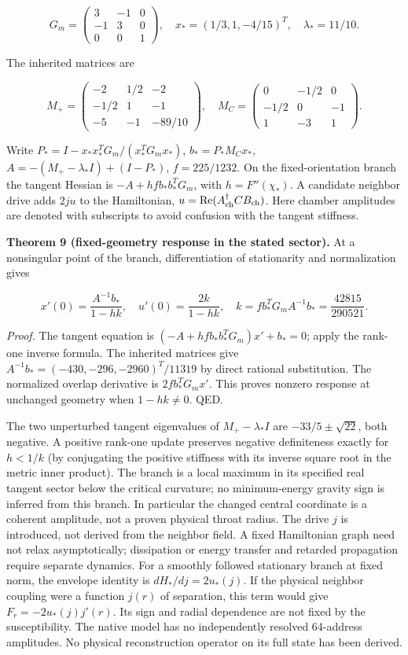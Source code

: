 \documentclass[
  11pt,
]{article}
\begin{document}
\[G_m=\begin{pmatrix}3&-1&0\\-1&3&0\\0&0&1\end{pmatrix},\quad x_*=(1/3,1,-4/15)^T,\quad \lambda_*=11/10.\]

The inherited matrices are

\[M_+=\begin{pmatrix}-2&1/2&-2\\-1/2&1&-1\\-5&-1&-89/10\end{pmatrix},\quad M_C=\begin{pmatrix}0&-1/2&0\\-1/2&0&-1\\1&-3&1\end{pmatrix}.\]

Write \(P_*=I-x_*x_*^TG_m/(x_*^TG_mx_*)\), \(b_*=P_*M_Cx_*\),
\(A=-(M_+-\lambda_*I)+(I-P_*)\), \(f=225/1232\). On the
fixed-orientation branch the tangent Hessian is \(-A+h f b_* b_*^TG_m\),
with \(h=F''(\chi_*)\). A candidate neighbor drive adds \(2j u\) to the
Hamiltonian, \(u=\operatorname{Re}(A_{\rm ch}^\dagger C B_{\rm ch})\).
Here chamber amplitudes are denoted with subscripts to avoid confusion
with the tangent stiffness.

\textbf{Theorem 9 (fixed-geometry response in the stated sector).} At a
nonsingular point of the branch, differentiation of stationarity and
normalization gives

\[x'(0)=\frac{A^{-1}b_*}{1-hk},\quad u'(0)=\frac{2k}{1-hk},\quad k=f b_*^TG_mA^{-1}b_*=\frac{42815}{290521}.\]

\emph{Proof.} The tangent equation is \((-A+hf b_*b_*^TG_m)x'+b_*=0\);
apply the rank-one inverse formula. The inherited matrices give
\(A^{-1}b_*=(-430,-296,-2960)^T/11319\) by direct rational substitution.
The normalized overlap derivative is \(2f b_*^TG_m x'\). This proves
nonzero response at unchanged geometry when \(1-hk\ne0\). QED.

The two unperturbed tangent eigenvalues of \(M_+-\lambda_*I\) are
\(-33/5\pm\sqrt{22}\), both negative. A positive rank-one update
preserves negative definiteness exactly for \(h<1/k\) (by conjugating
the positive stiffness with its inverse square root in the metric inner
product). The branch is a local maximum in its specified real tangent
sector below the critical curvature; no minimum-energy gravity sign is
inferred from this branch. In particular the changed central coordinate
is a coherent amplitude, not a proven physical throat radius. The drive
\(j\) is introduced, not derived from the neighbor field. A fixed
Hamiltonian graph need not relax asymptotically; dissipation or energy
transfer and retarded propagation require separate dynamics. For a
smoothly followed stationary branch at fixed norm, the envelope identity
is \(dH_*/dj=2u_*(j)\). If the physical neighbor coupling were a
function \(j(r)\) of separation, this term would give
\(F_r=-2u_*(j)j'(r)\). Its sign and radial dependence are not fixed by
the susceptibility. The native model has no independently resolved
64-address amplitudes. No physical reconstruction operator on its full
state has been derived.
\end{document}
